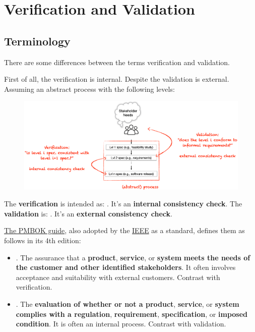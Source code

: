 \section{Verification and Validation}

\subsection{Terminology}

There are some differences between the terms verification and validation.

\highspace
First of all, the verification is internal. Despite the validation is external. Assuming an abstract process with the following levels:

\begin{figure}[!htp]
    \centering
    \includegraphics[width=\textwidth]{img/verification-and-validation-1.png}
\end{figure}

\noindent
The \textbf{verification} is intended as: . It's an \textbf{internal consistency check}. The \textbf{validation} is: . It's an \textbf{external consistency check}.

\highspace
\href{https://en.wikipedia.org/wiki/A_Guide_to_the_Project_Management_Body_of_Knowledge}{The PMBOK guide}, also adopted by the \href{https://en.wikipedia.org/wiki/IEEE}{IEEE} as a standard, defines them as follows in its 4th edition:
\begin{itemize}
    \item {}. The assurance that a \textbf{product}, \textbf{service}, or \textbf{system} \textbf{meets the needs of the customer and other identified stakeholders}. It often involves acceptance and suitability with external customers. Contrast with verification.
    
    \item {}. The \textbf{evaluation of whether or not a product}, \textbf{service}, or \textbf{system complies with a regulation}, \textbf{requirement}, \textbf{specification}, or \textbf{imposed condition}. It is often an internal process. Contrast with validation.
\end{itemize}

